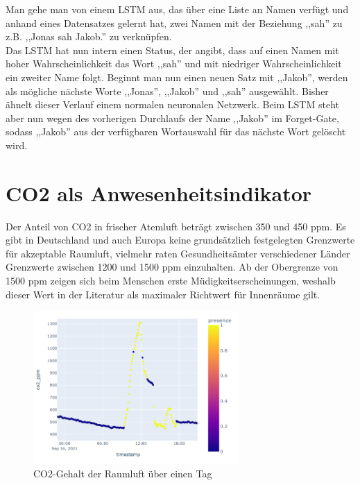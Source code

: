 \newpage
Man gehe man von einem LSTM aus, das über eine Liste an Namen verfügt und anhand eines Datensatzes gelernt
hat, zwei Namen mit der Beziehung ,,sah'' zu z.B. ,,Jonas sah Jakob.'' zu verknüpfen.\\
Das LSTM hat nun intern einen Status, der angibt, dass auf einen Namen mit hoher Wahrscheinlichkeit das Wort 
,,sah'' und mit niedriger Wahrscheinlichkeit ein zweiter Name folgt. 
Beginnt man nun einen neuen Satz mit ,,Jakob'', werden als mögliche nächste Worte ,,Jonas'', ,,Jakob'' und ,,sah''
ausgewählt. Bisher ähnelt dieser Verlauf einem normalen neuronalen Netzwerk. Beim LSTM
steht aber nun wegen des vorherigen Durchlaufs der Name ,,Jakob'' im Forget-Gate, sodass ,,Jakob'' aus der verfügbaren
Wortauswahl für das nächste Wort gelöscht wird.\\



\section{CO2 als Anwesenheitsindikator}\label{CO2}

Der Anteil von CO2 in frischer Atemluft beträgt zwischen 350 und 450 ppm. Es gibt in Deutschland und auch Europa 
keine grundsätzlich festgelegten Grenzwerte für akzeptable Raumluft, vielmehr raten Gesundheitsämter 
verschiedener Länder Grenzwerte zwischen 1200 und 1500 ppm einzuhalten. Ab der Obergrenze von 1500 ppm 
zeigen sich beim Menschen erste Müdigkeitserscheinungen, weshalb dieser Wert in der Literatur als maximaler 
Richtwert für Innenräume gilt.\\

\begin{figure}[h]
    \centering
    \includegraphics[width=0.7\textwidth]{pic/co2_singleDay.png}
    \caption{CO2-Gehalt der Raumluft über einen Tag}
    \label{fig:CO2_oneDay}
\end{figure}
 
